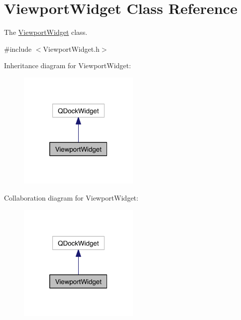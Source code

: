 \hypertarget{class_viewport_widget}{\section{Viewport\-Widget Class Reference}
\label{class_viewport_widget}
}


The \hyperlink{class_viewport_widget}{Viewport\-Widget} class.  




{\ttfamily \#include $<$Viewport\-Widget.\-h$>$}



Inheritance diagram for Viewport\-Widget\-:\nopagebreak
\begin{figure}[H]
\begin{center}
\leavevmode
\includegraphics[width=164pt]{class_viewport_widget__inherit__graph}
\end{center}
\end{figure}


Collaboration diagram for Viewport\-Widget\-:\nopagebreak
\begin{figure}[H]
\begin{center}
\leavevmode
\includegraphics[width=164pt]{class_viewport_widget__coll__graph}
\end{center}
\end{figure}
